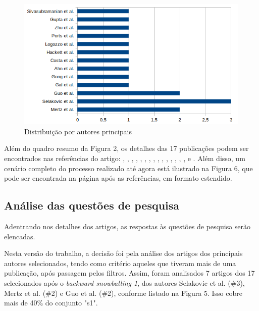 \documentclass[sigconf]{acmart}
\begin{document}
\begin{figure}[H]
  \centering
  \includegraphics[width=\linewidth]{authors}
  \caption{Distribuição por autores principais}
\end{figure}

Além do quadro resumo da Figura 2, os detalhes das 17 publicações podem ser encontrados nas referências do artigo: \cite{guo2011using}, \cite{selakovic2016performance}, \cite{selakovic2017actionable}, \cite{mertz2017understanding}, \cite{gal2009trace}, \cite{guo2010towards}, \cite{logozzo2010rata}, \cite{hackett2012fast}, \cite{costa2013just}, \cite{ahn2014improving}, \cite{selakovic2015poster}, \cite{gong2015jitprof}, \cite{sivasubramanian2007analysis}, \cite{gupta2011trigger}, \cite{zhu2012saving}, \cite{mertz2016qualitative} e \cite{ports2010transactional}. Além disso, um cenário completo do processo realizado até agora está ilustrado na Figura 6, que pode ser encontrada na página após as referências, em formato estendido.

\subsection{Análise das questões de pesquisa}
Adentrando nos detalhes dos artigos, as respostas às questões de pesquisa serão elencadas.

Nesta versão do trabalho, a decisão foi pela análise dos artigos dos principais autores selecionados, tendo como critério aqueles que tiveram mais de uma publicação, após passagem pelos filtros. Assim, foram analisados 7 artigos dos 17 selecionados após o \textit{backward snowballing 1}, dos autores Selakovic et al. (\#3), Mertz et al. (\#2) e Guo et al. (\#2), conforme listado na Figura 5. Isso cobre mais de 40\% do conjunto "s1".
\end{document}

